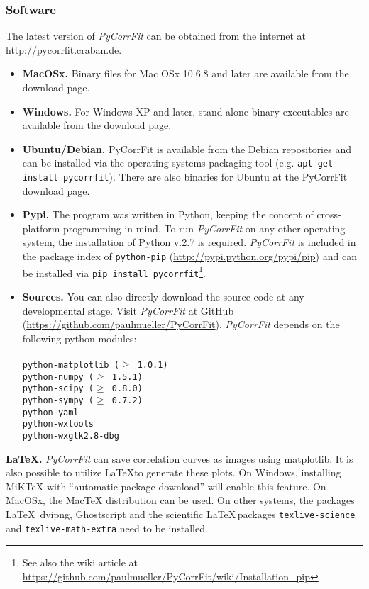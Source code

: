 \subsubsection{Software}
\label{sec:intro.prere.softw}
The latest version of \textit{PyCorrFit} can be obtained from the internet at \url{http://pycorrfit.craban.de}.
\begin{itemize}
\item \textbf{MacOSx.}
Binary files for Mac OSx 10.6.8 and later are available from the download page.
\item \textbf{Windows.}
For Windows XP and later, stand-alone binary executables are available from the download page. 
\item \textbf{Ubuntu/Debian.}
PyCorrFit is available from the Debian repositories and can be installed via the operating systems packaging tool (e.g. \texttt{apt-get install pycorrfit}). There are also binaries for Ubuntu at the PyCorrFit download page.
\item\textbf{Pypi.} The program was written in Python, keeping the concept of cross-platform programming in mind. To run \textit{PyCorrFit} on any other operating system, the installation of Python v.2.7 is required. \textit{PyCorrFit} is included in the package index of \texttt{python-pip} (\url{http://pypi.python.org/pypi/pip}) and can be installed via
\texttt{pip~install~pycorrfit}\footnote{See also the wiki article at \url{https://github.com/paulmueller/PyCorrFit/wiki/Installation_pip}}.
\item \textbf{Sources.}
You can also directly download the source code at any developmental stage. Visit \textit{PyCorrFit} at GitHub (\url{https://github.com/paulmueller/PyCorrFit}). \textit{PyCorrFit} depends on the following python modules:\\
\texttt{\\
python-matplotlib ($\geq$ 1.0.1) \\
python-numpy ($\geq$ 1.5.1) \\
python-scipy ($\geq$ 0.8.0) \\
python-sympy ($\geq$ 0.7.2) \\
python-yaml \\
python-wxtools \\
python-wxgtk2.8-dbg \\
}
\end{itemize}


\vspace{1em}
\noindent \textbf{\LaTeX .} \textit{PyCorrFit} can save correlation curves as images using matplotlib. It is also possible to utilize \LaTeX to generate these plots. On Windows, installing MiKTeX  with ``automatic package download'' will enable this feature. On MacOSx, the MacTeX distribution can be used. On other systems, the packages \LaTeX \, dvipng, Ghostscript and the scientific \LaTeX \,packages \texttt{texlive-science} and \texttt{texlive-math-extra} need to be installed.

